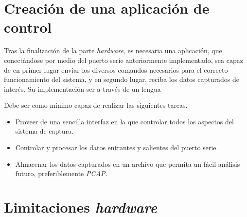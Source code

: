 \section{Creación de una aplicación de control}
Tras la finalización de la parte \emph{hardware}, es necesaria una aplicación, que conectándose por medio del puerto serie anteriormente implementado, sea capaz de en primer lugar enviar los diversos comandos necesarios para el correcto funcionamiento del sistema, y en segundo lugar, reciba los datos capturados de interés.
Su implementación ser a través de un lengua

Debe ser como mínimo capaz de realizar las siguientes tareas.
\begin{itemize}
    \item Proveer de una sencilla interfaz en la que controlar todos los aspectos del sistema de captura.
    \item Controlar y procesar los datos entrantes y salientes del puerto serie.
    \item Almacenar los datos capturados en un archivo que permita un fácil análisis futuro, preferiblemente \emph{PCAP}\cite{tcpdump:pcap}.
\end{itemize}



\section{Limitaciones \emph{hardware}}




